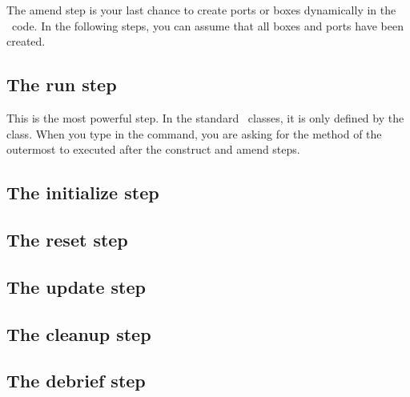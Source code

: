 The amend step is your last chance to create ports or boxes dynamically in the \CPP\ code. In the following steps, you can assume that all boxes and ports have been created.

\subsection{The run step}
This is the most powerful step. In the standard \US\ classes, it is only defined by the  class. When you type in the  command, you are asking for the  method of the outermost to executed after the construct and amend steps.

\subsection{The initialize step}

\subsection{The reset step}
\subsection{The update step}
\subsection{The cleanup step}
\subsection{The debrief step}
